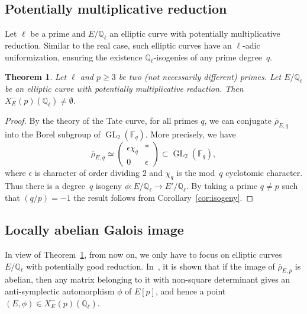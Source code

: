 \documentclass[12pt]{amsart}
\numberwithin{equation}{section}
\newtheorem{theorem}[equation]{Theorem}
\theoremstyle{definition}
\newcommand{\F}{\mathbb{F}}
\newcommand{\Q}{\mathbb{Q}}
\newcommand{\rhobar}{{\overline{\rho}}}
\newcommand{\Xp}{X_E^{-}(p)}
\DeclareMathOperator{\GL}{GL}
\begin{document}
\subsection{Potentially multiplicative reduction}
Let $\ell$ be a prime and $E/\Q_\ell$ an elliptic curve with potentially multiplicative reduction.
Similar to the real case, such elliptic curves have an $\ell$-adic uniformization, ensuring the existence $\Q_\ell$-isogenies of any prime degree~$q$.
\begin{theorem}\label{thm:multiplicative}
	Let $\ell$ and $p \geq 3$ be two (not necessarily different) primes.
	Let $E/\mathbb{Q}_\ell$ be an elliptic curve with potentially multiplicative reduction. Then $X_E^{-}(p)(\Q_\ell)\neq \emptyset$.
	\end{theorem}
	\begin{proof}
	By the theory of the Tate curve, for all primes $q$, we can conjugate $\rhobar_{E,q}$ into the Borel subgroup of $\GL_2(\F_q)$. More precisely, we have
	\begin{equation*}
			\rhobar_{E,q} \simeq
			\begin{pmatrix}
				\epsilon \chi_q & * \\
				0 & \epsilon
			\end{pmatrix} \subset \GL_2(\F_q),
		\end{equation*}
where $\epsilon$ is character of order dividing $2$ and $\chi_q$ is the mod~$q$ cyclotomic character. Thus there is a degree~$q$ isogeny
 $\phi : E/\Q_\ell \to E'/ \Q_\ell$. By taking a prime $q \neq p$ such that $(q/p) = -1$ the result follows from Corollary~\ref{cor:isogeny}.
\end{proof}

\subsection{Locally abelian Galois image}\label{sec:ab}
In view of Theorem~\ref{thm:multiplicative}, from now on, we only have to focus on elliptic curves $E/\Q_\ell$ with potentially good reduction.
In~\cite{symplectic}, it is shown that if the image of $\rhobar_{E,p}$ is abelian, then any matrix belonging to it with  non-square determinant gives an anti-symplectic automorphism $\phi$ of $E[p]$, and hence a point $(E,\phi)\in\Xp(\Q_\ell)$. 
\end{document}
